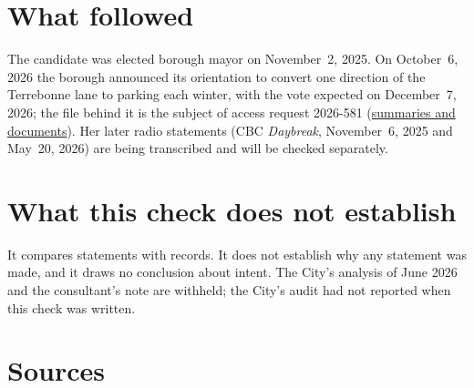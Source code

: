 \documentclass[11pt,letterpaper]{article}
\newcommand{\arurl}{https://github.com/OpenMobilityData/Terrebonne-access-requests}
\begin{document}
\section{What followed}

The candidate was elected borough mayor on November~2, 2025. On October~6,
2026 the borough announced its orientation to convert one direction of the
Terrebonne lane to parking each winter, with the vote expected on December~7,
2026; the file behind it is the subject of access request 2026-581
(\href{\arurl/tree/main/2026-581}{summaries and documents}). Her later radio
statements (CBC \emph{Daybreak}, November~6, 2025 and May~20, 2026) are being
transcribed and will be checked separately.

\section{What this check does not establish}

It compares statements with records. It does not establish why any statement
was made, and it draws no conclusion about intent. The City's analysis of June
2026 and the consultant's note are withheld; the City's audit had not reported
when this check was written.

\section{Sources}
\end{document}

